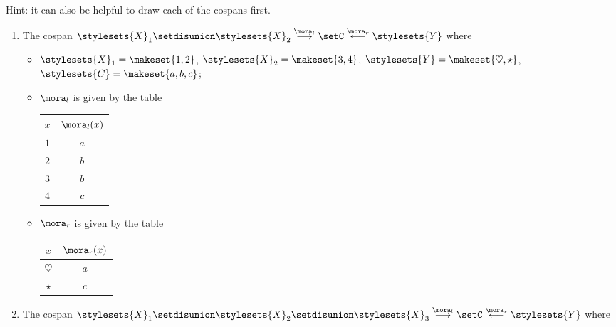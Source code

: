 \begin{gradedexercise}
    Hint: it can also be helpful to draw each of the cospans first.

    \begin{enumerate}
        \item The cospan $\stylesets{X}_1 \setdisunion \stylesets{X}_2 \overset{\mora_l}{\longrightarrow} \setC \overset{\mora_r}{\longleftarrow}  \stylesets{Y}$ where
              \begin{itemize}
                  \item $\stylesets{X}_1 = \makeset{1, 2}$, $\stylesets{X}_2 = \makeset{3, 4}$, $\stylesets{Y} = \makeset{\heartsuit, \star}$, $\stylesets{C} = \makeset{a, b, c}$;
                  \item $\mora_l$ is given by the table
                        \begin{center}
                            \begin{tabular}{c|c}
                                $x$ & $\mora_l(x)$ \\
                                \hline
                                $1$ & $a$ \\
                                $2$ & $b$ \\
                                $3$ & $b$ \\
                                $4$ & $c$
                            \end{tabular}
                        \end{center}
                  \item $\mora_r$ is given by the table
                        \begin{center}
                            \begin{tabular}{c|c}
                                $x$          & $\mora_r(x)$ \\
                                \hline
                                $\heartsuit$ & $a$ \\
                                $\star$      & $c$
                            \end{tabular}
                        \end{center}
              \end{itemize}
        \item The cospan $\stylesets{X}_1 \setdisunion \stylesets{X}_2 \setdisunion \stylesets{X}_3 \overset{\mora_l}{\longrightarrow} \setC \overset{\mora_r}{\longleftarrow} \stylesets{Y}$ where
              \begin{itemize}

\end{itemize}
\end{enumerate}
\end{gradedexercise}
